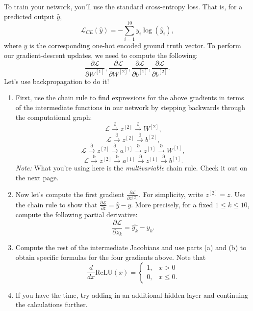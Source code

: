 \documentclass{article}
\newenvironment{envsection}[1]{\begin{trivlist}
\item[\hskip \labelsep {\bfseries #1}]}{\end{trivlist}}
\begin{document}
\begin{envsection}{Problem 2 (Backpropogation).}
    To train your network, you'll use the standard cross-entropy loss. That is, for a predicted output $\hat{y}$,
    \[
    \mathcal{L}_{CE}(\hat{y}) = -\sum_{i=1}^{10} y_i \log(\hat{y}_i),
    \]
    where $y$ is the corresponding one-hot encoded ground truth vector. To perform our gradient-descent updates, we need to compute the following:
    \[
    \frac{\partial\mathcal{L}}{\partial W^{[1]}}, \frac{\partial\mathcal{L}}{\partial W^{[2]}}, \frac{\partial\mathcal{L}}{\partial b^{[1]}}, \frac{\partial\mathcal{L}}{\partial b^{[2]}}.
    \]
    Let's use backpropagation to do it!
    \begin{enumerate}
        \item[(a)] First, use the chain rule to find expressions for the above gradients in terms of the intermediate functions in our network by stepping backwards through the computational graph:
            \[
            \mathcal{L} \overset{\partial}{\longrightarrow} z^{[2]} \overset{\partial}{\longrightarrow} W^{[2]},
            \]
            \[
            \mathcal{L} \overset{\partial}{\longrightarrow} z^{[2]} \overset{\partial}{\longrightarrow} b^{[2]},
            \]
            \[
            \mathcal{L} \overset{\partial}{\longrightarrow} z^{[2]} \overset{\partial}{\longrightarrow} a^{[1]} \overset{\partial}{\longrightarrow} z^{[1]} \overset{\partial}{\longrightarrow} W^{[1]},
            \]
            \[
            \mathcal{L} \overset{\partial}{\longrightarrow} z^{[2]} \overset{\partial}{\longrightarrow} a^{[1]} \overset{\partial}{\longrightarrow} z^{[1]} \overset{\partial}{\longrightarrow} b^{[1]}.
            \]
            \textit{Note:} What you're using here is the \textit{multivariable} chain rule. Check it out on the next page.
        \item[(b)] Now let's compute the first gradient $\frac{\partial\mathcal{L}}{\partial z^{[2]}}$. For simplicity, write $z^{[2]} = z$. Use the chain rule to show that $\frac{\partial\mathcal{L}}{\partial z} = \hat{y} - y$. More precisely, for a fixed $1 \leq k \leq 10$, compute the following partial derivative:
            \[
            \frac{\partial\mathcal{L}}{\partial z_k} = \hat{y_k} - y_k.
            \]
        \item[(c)] Compute the rest of the intermediate Jacobians and use parts (a) and (b) to obtain specific formulas for the four gradients above. Note that
            \[
            \frac{d}{d x} \text{ReLU}(x) = 
            \begin{cases}
                1, &x > 0\\
                0, &x \leq 0.
            \end{cases}
            \]
        \item[(d)] If you have the time, try adding in an additional hidden layer and continuing the calculations further.
    \end{enumerate}
\end{envsection}
\end{document}
